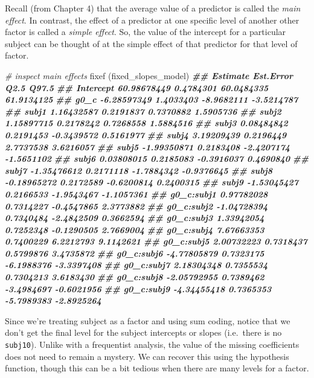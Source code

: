 \documentclass[
]{book}
\newenvironment{Shaded}{\begin{snugshade}}{\end{snugshade}}
\newcommand{\CommentTok}[1]{\textcolor[rgb]{0.56,0.35,0.01}{\textit{#1}}}
\newcommand{\DocumentationTok}[1]{\textcolor[rgb]{0.56,0.35,0.01}{\textbf{\textit{#1}}}}
\newcommand{\FunctionTok}[1]{\textcolor[rgb]{0.00,0.00,0.00}{#1}}
\newcommand{\NormalTok}[1]{#1}
\begin{document}
Recall (from Chapter 4) that the average value of a predictor is called the \emph{main effect}. In contrast, the effect of a predictor at one specific level of another other factor is called a \emph{simple effect}. So, the value of the intercept for a particular subject can be thought of at the simple effect of that predictor for that level of factor.

\begin{Shaded}
\begin{Highlighting}[]
\CommentTok{\# inspect main effects}
\FunctionTok{fixef}\NormalTok{ (fixed\_slopes\_model)}
\DocumentationTok{\#\#               Estimate Est.Error       Q2.5      Q97.5}
\DocumentationTok{\#\# Intercept  60.98678449 0.4784301 60.0484335 61.9134125}
\DocumentationTok{\#\# g0\_c       {-}6.28597349 1.4033403 {-}8.9682111 {-}3.5214787}
\DocumentationTok{\#\# subj1       1.16432587 0.2191837  0.7370882  1.5905736}
\DocumentationTok{\#\# subj2       1.15897715 0.2178242  0.7268558  1.5884516}
\DocumentationTok{\#\# subj3       0.08484842 0.2191453 {-}0.3439572  0.5161977}
\DocumentationTok{\#\# subj4       3.19209439 0.2196449  2.7737538  3.6216057}
\DocumentationTok{\#\# subj5      {-}1.99350871 0.2183408 {-}2.4207174 {-}1.5651102}
\DocumentationTok{\#\# subj6       0.03808015 0.2185083 {-}0.3916037  0.4690840}
\DocumentationTok{\#\# subj7      {-}1.35476612 0.2171118 {-}1.7884342 {-}0.9376645}
\DocumentationTok{\#\# subj8      {-}0.18965272 0.2172589 {-}0.6200814  0.2400315}
\DocumentationTok{\#\# subj9      {-}1.53045427 0.2166533 {-}1.9543467 {-}1.1057361}
\DocumentationTok{\#\# g0\_c:subj1  0.97782028 0.7314227 {-}0.4547865  2.3773882}
\DocumentationTok{\#\# g0\_c:subj2 {-}1.04728394 0.7340484 {-}2.4842509  0.3662594}
\DocumentationTok{\#\# g0\_c:subj3  1.33942054 0.7252348 {-}0.1290505  2.7669004}
\DocumentationTok{\#\# g0\_c:subj4  7.67663353 0.7400229  6.2212793  9.1142621}
\DocumentationTok{\#\# g0\_c:subj5  2.00732223 0.7318437  0.5799876  3.4735872}
\DocumentationTok{\#\# g0\_c:subj6 {-}4.77805879 0.7323175 {-}6.1988376 {-}3.3397408}
\DocumentationTok{\#\# g0\_c:subj7  2.18304348 0.7355534  0.7304213  3.6183430}
\DocumentationTok{\#\# g0\_c:subj8 {-}2.05792955 0.7389462 {-}3.4984697 {-}0.6021956}
\DocumentationTok{\#\# g0\_c:subj9 {-}4.34455418 0.7365353 {-}5.7989383 {-}2.8925264}
\end{Highlighting}
\end{Shaded}

Since we're treating subject as a factor and using sum coding, notice that we don't get the final level for the subject intercepts or slopes (i.e.~there is no \texttt{subj10}). Unlike with a frequentist analysis, the value of the missing coefficients does not need to remain a mystery. We can recover this using the hypothesis function, though this can be a bit tedious when there are many levels for a factor.
\end{document}
